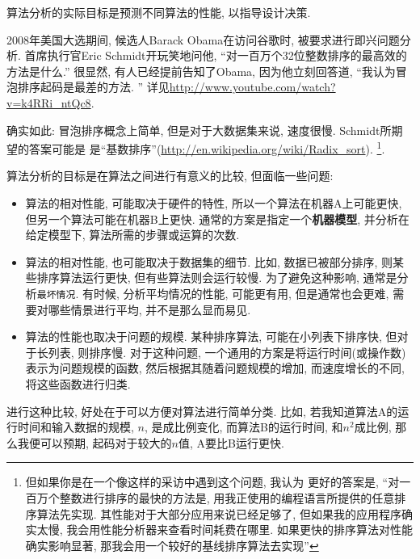 \documentclass[10pt]{book}
\begin{document}
算法分析的实际目标是预测不同算法的性能, 以指导设计决策. 

2008年美国大选期间, 候选人Barack Obama在访问谷歌时, 被要求进行即兴问题分析. 
首席执行官Eric Schmidt开玩笑地问他, ``对一百万个32位整数排序的最高效的方法是什么.''
很显然, 有人已经提前告知了Obama, 因为他立刻回答道, ``我认为冒泡排序起码是最差的方法. ''
详见\url{http://www.youtube.com/watch?v=k4RRi_ntQc8}.

确实如此: 冒泡排序概念上简单, 但是对于大数据集来说, 速度很慢. 
Schmidt所期望的答案可能是
是``基数排序''(\url{http://en.wikipedia.org/wiki/Radix_sort}). \footnote{
但如果你是在一个像这样的采访中遇到这个问题, 我认为
更好的答案是, ``对一百万个整数进行排序的最快的方法是, 
用我正使用的编程语言所提供的任意排序算法先实现. 
其性能对于大部分应用来说已经足够了, 但如果我的应用程序确实太慢, 
我会用性能分析器来查看时间耗费在哪里. 
如果更快的排序算法对性能确实影响显著, 那我会用一个较好的基线排序算法去实现''}.

算法分析的目标是在算法之间进行有意义的比较, 但面临一些问题:

\begin{itemize}

\item 算法的相对性能, 可能取决于硬件的特性, 所以一个算法在机器A上可能更快, 
但另一个算法可能在机器B上更快. 
通常的方案是指定一个{\bf 机器模型}, 并分析在给定模型下, 
算法所需的步骤或运算的次数. 

\item 算法的相对性能, 也可能取决于数据集的细节. 
比如, 数据已被部分排序, 则某些排序算法运行更快, 
但有些算法则会运行较慢. 
为了避免这种影响, 通常是分析{\tt 最坏情况}. 
有时候, 分析平均情况的性能, 可能更有用, 但是通常也会更难, 
需要对哪些情景进行平均, 并不是那么显而易见. 

\item 算法的性能也取决于问题的规模. 
某种排序算法, 可能在小列表下排序快, 但对于长列表, 则排序慢. 
对于这种问题, 一个通用的方案是将运行时间(或操作数)表示为问题规模的函数, 
然后根据其随着问题规模的增加, 而速度增长的不同, 将这些函数进行归类. 

\end{itemize}

进行这种比较, 好处在于可以方便对算法进行简单分类. 
比如, 若我知道算法A的运行时间和输入数据的规模, $n$, 是成比例变化, 
而算法B的运行时间, 和$n^2$成比例, 
那么我便可以预期, 起码对于较大的$n$值, A要比B运行更快. 
\end{document}
